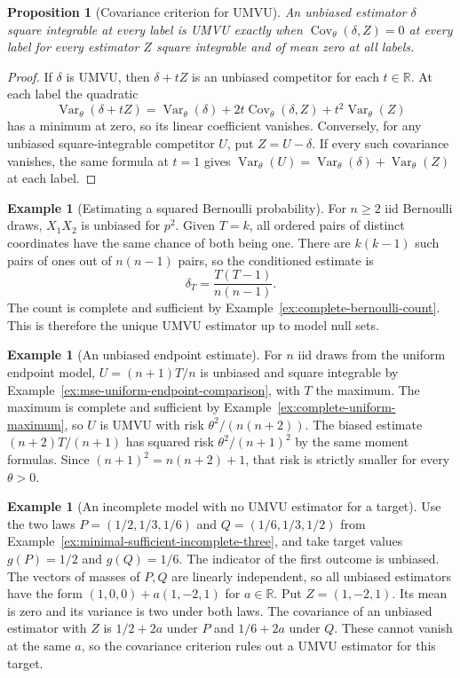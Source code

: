 \documentclass[11pt,oneside]{book}
\newtheorem{proposition}[theorem]{Proposition}
\theoremstyle{definition}
\newtheorem{example}[theorem]{Example}
\theoremstyle{remark}
\newcommand{\R}{\mathbb R}
\begin{document}
\begin{proposition}[Covariance criterion for UMVU]
\label{prop:umvu-covariance-criterion}
An unbiased estimator $\delta$ square integrable at every label
is UMVU exactly when $\operatorname{Cov}_\theta(\delta,Z)=0$
at every label for every estimator $Z$ square integrable and
of mean zero at all labels.
\end{proposition}
\begin{proof}
If $\delta$ is UMVU, then $\delta+tZ$ is an unbiased competitor for
each $t\in\R$. At each label the quadratic
\[
\operatorname{Var}_\theta(\delta+tZ)
=\operatorname{Var}_\theta(\delta)
 +2t\operatorname{Cov}_\theta(\delta,Z)+t^2\operatorname{Var}_\theta(Z)
\]
has a minimum at zero, so its linear coefficient vanishes.
Conversely, for any unbiased square-integrable competitor $U$, put
$Z=U-\delta$. If every such covariance vanishes, the same formula
at $t=1$ gives
$\operatorname{Var}_\theta(U)=\operatorname{Var}_\theta(\delta)
+\operatorname{Var}_\theta(Z)$ at each label.
\end{proof}

\begin{example}[Estimating a squared Bernoulli probability]
\label{ex:umvu-bernoulli-squared}
For $n\geq2$ iid Bernoulli draws, $X_1X_2$ is unbiased for $p^2$.
Given $T=k$, all ordered pairs of distinct coordinates have the
same chance of both being one. There are $k(k-1)$ such pairs
of ones out of $n(n-1)$ pairs, so the conditioned estimate is
\[
\delta_T=\frac{T(T-1)}{n(n-1)}.
\]
The count is complete and sufficient by
Example~\ref{ex:complete-bernoulli-count}. This is therefore the
unique UMVU estimator up to model null sets.
\end{example}

\begin{example}[An unbiased endpoint estimate]
\label{ex:umvu-uniform-endpoint}
For $n$ iid draws from the uniform endpoint model,
$U=(n+1)T/n$ is unbiased and square integrable by
Example~\ref{ex:mse-uniform-endpoint-comparison}, with
$T$ the maximum. The maximum is complete and sufficient by
Example~\ref{ex:complete-uniform-maximum}, so $U$ is UMVU with
risk $\theta^2/(n(n+2))$. The biased estimate $(n+2)T/(n+1)$
has squared risk $\theta^2/(n+1)^2$ by the same moment formulas.
Since $(n+1)^2=n(n+2)+1$, that risk is strictly smaller
for every $\theta>0$.
\end{example}

\begin{example}[An incomplete model with no UMVU estimator for a target]
\label{ex:umvu-may-not-exist}
Use the two laws $P=(1/2,1/3,1/6)$ and $Q=(1/6,1/3,1/2)$ from
Example~\ref{ex:minimal-sufficient-incomplete-three}, and take target
values $g(P)=1/2$ and $g(Q)=1/6$. The indicator of the first outcome
is unbiased. The vectors of masses of $P,Q$ are linearly independent,
so all unbiased estimators have the form $(1,0,0)+a(1,-2,1)$ for
$a\in\R$. Put $Z=(1,-2,1)$. Its mean is zero and its variance
is two under both laws. The covariance of an unbiased estimator
with $Z$ is $1/2+2a$ under $P$ and $1/6+2a$ under $Q$.
These cannot vanish at the same $a$, so the covariance criterion
rules out a UMVU estimator for this target.
\end{example}
\end{document}

